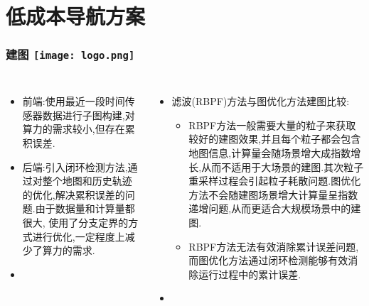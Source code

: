 
\section{低成本导航方案}

\begin{comment}
\end{comment}
\begin{frame}
\frametitle{建图 \hfill \texttt{[image: logo.png]}}
\begin{columns}
	\begin{itemize}
		\item 前端:使用最近一段时间传感器数据进行子图构建,对算力的需求较小,但存在累积误差.
		\item 后端:引入闭环检测方法,通过对整个地图和历史轨迹的优化,解决累积误差的问题.由于数据量和计算量都很大,
		使用了分支定界的方式进行优化,一定程度上减少了算力的需求.
		\vspace{0.2cm}
		\item 
	\end{itemize}
	\begin{itemize}
		\item 滤波(RBPF)方法与图优化方法建图比较:
		\begin{itemize}
			\item RBPF方法一般需要大量的粒子来获取较好的建图效果,并且每个粒子都会包含地图信息,计算量会随场景增大成指数增长,从而不适用于大场景的建图.其次粒子重采样过程会引起粒子耗散问题.图优化方法不会随建图场景增大计算量呈指数递增问题,从而更适合大规模场景中的建图.
			\item RBPF方法无法有效消除累计误差问题,而图优化方法通过闭环检测能够有效消除运行过程中的累计误差.
		\end{itemize}
		\vspace{0.5cm}
		\item
	\end{itemize}
\end{columns}
\end{frame}

